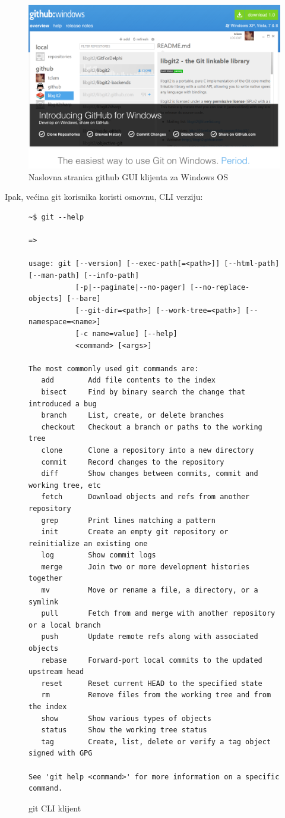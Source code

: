 \documentclass[times, utf8, seminar]{fit}
\begin{document}
\begin{figure}[H]
\centering
\includegraphics[width=12cm]{img/github_windows.png}
\caption{Naslovna stranica github GUI klijenta za Windows OS}
\end{figure}


Ipak, većina git korisnika koristi osnovnu, CLI verziju:

\begin{figure}[H]
\begin{lstlisting}
~$ git --help

=>

usage: git [--version] [--exec-path[=<path>]] [--html-path] [--man-path] [--info-path]
           [-p|--paginate|--no-pager] [--no-replace-objects] [--bare]
           [--git-dir=<path>] [--work-tree=<path>] [--namespace=<name>]
           [-c name=value] [--help]
           <command> [<args>]

The most commonly used git commands are:
   add        Add file contents to the index
   bisect     Find by binary search the change that introduced a bug
   branch     List, create, or delete branches
   checkout   Checkout a branch or paths to the working tree
   clone      Clone a repository into a new directory
   commit     Record changes to the repository
   diff       Show changes between commits, commit and working tree, etc
   fetch      Download objects and refs from another repository
   grep       Print lines matching a pattern
   init       Create an empty git repository or reinitialize an existing one
   log        Show commit logs
   merge      Join two or more development histories together
   mv         Move or rename a file, a directory, or a symlink
   pull       Fetch from and merge with another repository or a local branch
   push       Update remote refs along with associated objects
   rebase     Forward-port local commits to the updated upstream head
   reset      Reset current HEAD to the specified state
   rm         Remove files from the working tree and from the index
   show       Show various types of objects
   status     Show the working tree status
   tag        Create, list, delete or verify a tag object signed with GPG

See 'git help <command>' for more information on a specific command.
\end{lstlisting}
\caption{git CLI klijent}
\end{figure}
\end{document}
